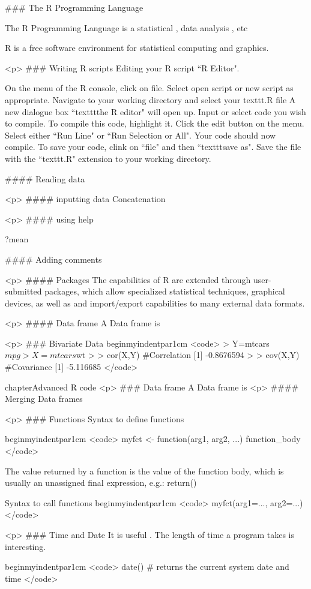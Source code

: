 
### {The R Programming Language}

The R Programming Language is a statistical , data analysis , etc

R is a free software environment for statistical computing and graphics.

<p>
### {Writing R scripts}
Editing your R script ``R Editor".

On the menu of the R console, click on file.
Select open script or new script as appropriate.
Navigate to your working directory and select your texttt{.R} file
A new dialogue box ``texttt{the R editor}" will open up.
Input or select code you wish to compile.
To compile this code, highlight it. Click the edit button on the menu.
Select either ``Run Line" or ``Run Selection or All".
Your code should now compile.
To save your code, clink on ``file" and then ``texttt{save as}".
Save the file with the ``texttt{.R}" extension to your working directory.




#### {Reading data}


<p>
#### {inputting data}
 Concatenation

<p>
#### {using help}

?mean

#### {Adding comments}

<p>
#### {Packages}
The capabilities of R are extended through user-submitted packages, which allow specialized statistical techniques, graphical devices, as well as and
import/export capabilities to many external data formats.


<p>
#### {Data frame}
A Data frame is





<p>
### {Bivariate Data}
 begin{myindentpar}{1cm}
<code>
> Y=mtcars$mpg
> X=mtcars$wt
>
> cor(X,Y)   #Correlation
[1] -0.8676594
>
> cov(X,Y)   #Covariance
[1] -5.116685
</code>






chapter{Advanced R code}
<p>
### {Data frame}
A Data frame is
<p>
#### {Merging Data frames}

<p>
### {Functions}
Syntax to define functions

begin{myindentpar}{1cm}
<code>
 myfct <- function(arg1, arg2, ...) { function_body }
</code>

The value returned by a function is the value of the function body, which is usually an unassigned final expression, e.g.: return()

Syntax to call functions
begin{myindentpar}{1cm}
<code>
 myfct(arg1=..., arg2=...)
</code>



<p>
### {Time and Date}
It is useful . The length of time a program takes is interesting.


begin{myindentpar}{1cm}
<code>
date() # returns the current system date and time
</code>




